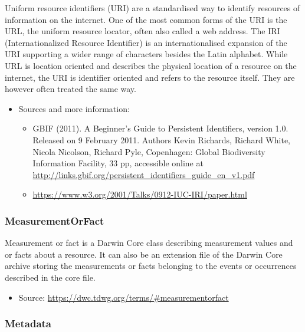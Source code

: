 \documentclass[
  oneside]{book}
\providecommand{\tightlist}{%
  \setlength{\itemsep}{0pt}\setlength{\parskip}{0pt}}
\begin{document}
Uniform resource identifiers (URI) are a standardised way to identify resources of information on the internet. One of the most common forms of the URI is the URL, the uniform resource locator, often also called a web address. The IRI (Internationalized Resource Identifier) is an internationalised expansion of the URI supporting a wider range of characters besides the Latin alphabet. While URL is location oriented and describes the physical location of a resource on the internet, the URI is identifier oriented and refers to the resource itself. They are however often treated the same way.

\begin{itemize}
\tightlist
\item
  Sources and more information:

  \begin{itemize}
  \tightlist
  \item
    GBIF (2011). A Beginner's Guide to Persistent Identifiers, version 1.0. Released on 9 February 2011. Authors Kevin Richards, Richard White, Nicola Nicolson, Richard Pyle, Copenhagen: Global Biodiversity Information Facility, 33 pp, accessible online at \url{http://links.gbif.org/persistent_identifiers_guide_en_v1.pdf}
  \item
    \url{https://www.w3.org/2001/Talks/0912-IUC-IRI/paper.html}
  \end{itemize}
\end{itemize}

\subsubsection*{MeasurementOrFact}\label{measurementorfact}

Measurement or fact is a Darwin Core class describing measurement values and or facts about a resource. It can also be an extension file of the Darwin Core archive storing the measurements or facts belonging to the events or occurrences described in the core file.

\begin{itemize}
\tightlist
\item
  Source: \url{https://dwc.tdwg.org/terms/\#measurementorfact}
\end{itemize}

\subsubsection*{Metadata}\label{metadata}
\end{document}
